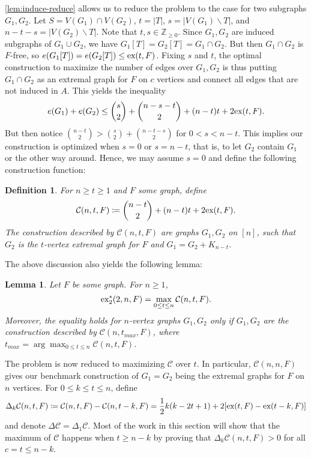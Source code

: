 \documentclass[10pt, reqno]{report}
\newtheorem{lemma}[theorem]{Lemma}
\newtheorem{definition}[theorem]{Definition}
\newcommand*{\Z}{\mathbb{Z}}
\newcommand*{\ex}{\textnormal{ex}}
\newcommand*{\dex}{\textnormal{ex}_2}
\newcommand*{\con}{\mathcal{C}}
\begin{document}
\cref{lem:induce-reduce} allows us to reduce the problem to the case for two subgraphs $G_1, G_2$. Let $S = V(G_1) \cap V(G_2)$, $t = |T|$, $s = |V(G_1) \backslash T|$, and $n - t - s = |V(G_2) \backslash T|$. Note that $t, s \in \Z_{\geq 0}$. Since $G_1, G_2$ are induced subgraphs of $G_1 \cup G_2$, we have $G_1[T] = G_2[T] = G_1 \cap G_2$. But then $G_1 \cap G_2$ is $F$-free, so $e(G_1[T]) = e(G_2[T]) \leq \ex(t, F)$. Fixing $s$ and $t$, the optimal construction to maximize the number of edges over $G_1, G_2$ is thus putting $G_1 \cap G_2$ as an extremal graph for $F$ on $c$ vertices and connect all edges that are not induced in $A$. This yields the inequality
\[
  e(G_1) + e(G_2) \leq \binom{s}{2} + \binom{n - s - t}{2} + (n - t)t + 2\ex(t, F).
\]
But then notice $\binom{n - t}{2} > \binom{s}{2} + \binom{n - t - s}{2}$ for $0 < s < n - t$. This implies our construction is optimized when $s = 0$ or $s = n - t$, that is, to let $G_2$ contain $G_1$ or the other way around. Hence, we may assume $s = 0$ and define the following construction function:

\begin{definition}
  For $n \geq t \geq 1$ and $F$ some graph, define 
  \[
    \con(n, t, F) \coloneq \binom{n - t}{2} + (n - t)t + 2\ex(t, F).
  \]
  The construction described by $\con(n, t, F)$ are graphs $G_1, G_2$ on $[n]$, such that $G_2$ is the $t$-vertex extremal graph for $F$ and $G_1 = G_2 + K_{n - t}$. 
\end{definition}

The above discussion also yields the following lemma:

\begin{lemma}\label{lem:optimize-con}
  Let $F$ be some graph. For $n \geq 1$,
  \[
    \dex^*(2, n, F) = \max_{0 \leq t \leq n} \con(n, t, F).
  \]
  Moreover, the equality holds for $n$-vertex graphs $G_1, G_2$ only if $G_1, G_2$ are the construction described by $\con(n, t_{max}, F)$, where $t_{max} = \arg\max_{0 \leq t \leq n} \con(n, t, F)$.
\end{lemma}

The problem is now reduced to maximizing $\con$ over $t$. In particular, $\con(n, n, F)$ gives our benchmark construction of $G_1 = G_2$ being the extremal graphs for $F$ on $n$ vertices. For $0 \leq k \leq t \leq n$, define
\[
  \Delta_k \con(n, t, F) \coloneq \con(n, t, F) - \con(n, t - k, F) = \frac{1}{2}k(k - 2t + 1) + 2[\ex(t, F) - \ex(t - k, F)]
\]
and denote $\Delta \con = \Delta_1 \con$. Most of the work in this section will show that the maximum of $\con$ happens when $t \geq n - k$ by proving that $\Delta_k \con(n, t, F) > 0$ for all $c=t \leq n - k$.
\end{document}
